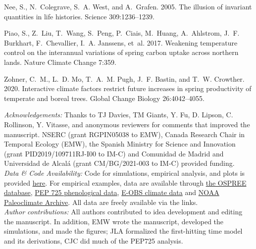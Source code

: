 \documentclass[11pt,letter]{article}
\begin{document}
\begin{thebibliography}{10}
Nee, S., N.~Colegrave, S.~A. West, and A.~Grafen. 2005.
\newblock The illusion of invariant quantities in life histories.
\newblock Science 309:1236--1239.

Piao, S., Z.~Liu, T.~Wang, S.~Peng, P.~Ciais, M.~Huang, A.~Ahlstrom, J.~F.
  Burkhart, F.~Chevallier, I.~A. Janssens, et~al. 2017.
\newblock Weakening temperature control on the interannual variations of spring
  carbon uptake across northern lands.
\newblock Nature Climate Change 7:359.

Zohner, C.~M., L.~D. Mo, T.~A.~M. Pugh, J.~F. Bastin, and T.~W. Crowther. 2020.
\newblock Interactive climate factors restrict future increases in spring
  productivity of temperate and boreal trees.
\newblock Global Change Biology 26:4042--4055.

\end{thebibliography}

\vspace{5ex}

\emph{Acknowledgements:} Thanks to TJ Davies, TM Giants, Y. Fu, D. Lipson, C. Rollinson, Y. Vitasse, and anonymous reviewers for comments that improved the manuscript.  NSERC (grant RGPIN­05038 to EMW), Canada Research Chair in Temporal Ecology (EMW), the Spanish Ministry for Science and Innovation (grant PID2019/109711RJ-I00 to IM-C) and Comunidad de Madrid and Universidad de Alcal\'a (grant CM/BG/2021-003 to IM-C) provided funding. 
\\ %

\emph{Data \& Code Availability:} Code for simulations, empirical analysis, and plots is provided \href{https://github.com/temporalecologylab/labgit/tree/master/projects/decsenspost}{here}. For empirical examples, data are available through \href{https://knb.ecoinformatics.org}{the OSPREE database}, \href{http://www.pep725.eu/data.php}{PEP 725 phenological data}, \href{https://surfobs.climate.copernicus.eu/dataaccess/access_eobs.php}{E-OBS climate data} and \href{https://www.ncdc.noaa.gov/data-access/paleoclimatology-data/datasets}{NOAA Paleoclimate Archive}. All data are freely available via the links.\\

\emph{Author contributions:} All authors contributed to idea development and editing the manuscript. In addition, EMW wrote the manuscript, developed the simulations, and made the figures; JLA formalized the first-hitting time model and its derivations, CJC did much of the PEP725 analysis.\\
\end{document}

